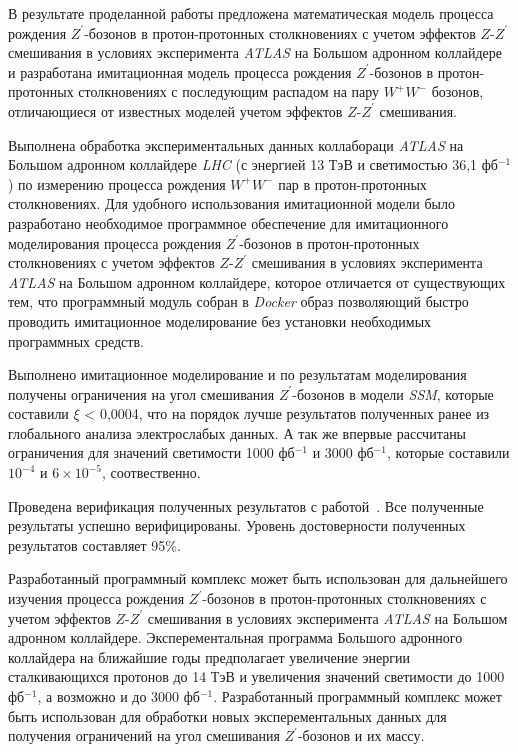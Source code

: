 В результате проделанной работы предложена математическая
модель процесса
рождения ${Z}^{\prime}$-бозонов в протон-протонных столкновениях с учетом эффектов $Z$-${Z}^{\prime}$ смешивания в условиях эксперимента \textit{ATLAS} на Большом адронном коллайдере и разработана имитационная модель процесса рождения ${Z}^{\prime}$-бозонов в протон-протонных столкновениях с последующим распадом на пару ${W}^{+}{W}^{-}$ бозонов, отличающиеся от известных моделей учетом эффектов $Z$-${Z}^{\prime}$ смешивания.

Выполнена обработка экспериментальных данных коллабораци  \textit{ATLAS} на Большом адронном коллайдере \textit{LHC} (с энергией 13 ТэВ и светимостью 36,1 фб${}^{−1}$) по измерению процесса рождения ${W}^{+}$${W}^{-}$ пар в протон-протонных столкновениях.
Для удобного использования имитационной модели было разработано необходимое программное обеспечение для имитационного моделирования процесса
рождения ${Z}^{\prime}$-бозонов в протон-протонных столкновениях с учетом эффектов $Z$-${Z}^{\prime}$ смешивания в условиях эксперимента \textit{ATLAS} на Большом адронном коллайдере, которое отличается от существующих тем, что программный модуль собран в \textit{Docker} образ позволяющий быстро проводить имитационное моделирование без установки необходимых программных средств.

Выполнено имитационное моделирование и по результатам моделирования получены ограничения на угол смешивания ${Z}^{\prime}$-бозонов в модели \textit{SSM}, которые составили $\xi$ < 0,0004, что на порядок лучше результатов полученных ранее из глобального анализа электрослабых данных. А так же впервые рассчитаны ограничения для значений светимости 1000 фб${}^{−1}$ и 3000 фб${}^{−1}$, которые составили ${10}^{-4}$ и $6\times{10}^{-5}$, соотвественно.

Проведена верификация полученных результатов с
работой~\cite{2part-pankov}. Все полученные результаты успешно верифицированы. Уровень достоверности полученных результатов составляет 95\%.

Разработанный программный комплекс может быть использован для дальнейшего изучения процесса рождения ${Z}^{\prime}$-бозонов в протон-протонных столкновениях с учетом эффектов $Z$-${Z}^{\prime}$ смешивания в условиях эксперимента \textit{ATLAS} на Большом адронном коллайдере. Эксперементальная программа Большого адронного коллайдера на  ближайшие годы предполагает увеличение энергии сталкивающихся протонов до 14 ТэВ и увеличения значений светимости до 1000 фб${}^{−1}$, а возможно и до 3000 фб${}^{−1}$. Разработанный программный комплекс может быть использован для обработки новых эксперементальных данных для получения ограничений на угол смешивания ${Z}^{\prime}$-бозонов и их массу.